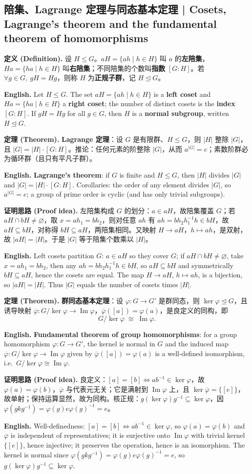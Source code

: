 \documentclass[UTF8,11pt,a4paper]{ctexart}
\newcommand{\EN}[1]{\par\noindent \textbf{English.} #1\par}
\newcommand{\DEF}[2]{\par\noindent\textbf{定义 (Definition).} #1\par\EN{#2}}
\newcommand{\THM}[2]{\par\noindent\textbf{定理 (Theorem).} #1\par\EN{#2}}
\newcommand{\PRF}[2]{\par\noindent\textbf{证明思路 (Proof idea).} #1\par\EN{#2}}
\begin{document}
\subsection{陪集、Lagrange 定理与同态基本定理 | Cosets, Lagrange's theorem and the fundamental theorem of homomorphisms}
\DEF{设 $H\le G$。$aH=\{ah\mid h\in H\}$ 叫 $a$ 的\textbf{左陪集}，$Ha=\{ha\mid h\in H\}$ 叫\textbf{右陪集}；不同陪集的个数叫\textbf{指数} $[G:H]$。若 $\forall g\in G,\ gH=Hg$，则称 $H$ 为\textbf{正规子群}，记 $H\trianglelefteq G$。}{Let $H\le G$. The set $aH=\{ah\mid h\in H\}$ is a \textbf{left coset} and $Ha=\{ha\mid h\in H\}$ a \textbf{right coset}; the number of distinct cosets is the \textbf{index} $[G:H]$. If $gH=Hg$ for all $g\in G$, then $H$ is a \textbf{normal subgroup}, written $H\trianglelefteq G$.}
\THM{\textbf{Lagrange 定理}：设 $G$ 是有限群、$H\le G$，则 $|H|$ 整除 $|G|$，且 $|G|=|H|\cdot[G:H]$。推论：任何元素的阶整除 $|G|$，从而 $a^{|G|}=e$；素数阶群必为循环群（且只有平凡子群）。}{\textbf{Lagrange's theorem}: if $G$ is finite and $H\le G$, then $|H|$ divides $|G|$ and $|G|=|H|\cdot[G:H]$. Corollaries: the order of any element divides $|G|$, so $a^{|G|}=e$; a group of prime order is cyclic (and has only trivial subgroups).}
\PRF{左陪集构成 $G$ 的划分：$a\in aH$，故陪集覆盖 $G$；若 $aH\cap bH\ne\varnothing$，取 $x=ah_1=bh_2$，则对任意 $ah$ 有 $ah=bh_2h_1^{-1}h\in bH$，故 $aH\subseteq bH$，对称得 $bH\subseteq aH$，两陪集相同。又映射 $H\to aH$，$h\mapsto ah$，是双射，故 $|aH|=|H|$。于是 $|G|$ 等于陪集个数乘以 $|H|$。}{Left cosets partition $G$: $a\in aH$ so they cover $G$; if $aH\cap bH\ne\varnothing$, take $x=ah_1=bh_2$, then any $ah=bh_2h_1^{-1}h\in bH$, so $aH\subseteq bH$ and symmetrically $bH\subseteq aH$, hence the cosets are equal. The map $H\to aH$, $h\mapsto ah$, is a bijection, so $|aH|=|H|$. Thus $|G|$ equals the number of cosets times $|H|$.}
\THM{\textbf{群同态基本定理}：设 $\varphi:G\to G'$ 是群同态，则 $\ker\varphi\trianglelefteq G$，且诱导映射 $\overline\varphi:G/\ker\varphi\to\operatorname{Im}\varphi$，$\overline\varphi([a])=\varphi(a)$，是良定义的同构，即
\[
G/\ker\varphi\;\cong\;\operatorname{Im}\varphi .
\]
}{\textbf{Fundamental theorem of group homomorphisms}: for a group homomorphism $\varphi:G\to G'$, the kernel is normal in $G$ and the induced map $\overline\varphi:G/\ker\varphi\to\operatorname{Im}\varphi$ given by $\overline\varphi([a])=\varphi(a)$ is a well-defined isomorphism, i.e.\ $G/\ker\varphi\cong\operatorname{Im}\varphi$.}
\PRF{良定义：$[a]=[b]\Leftrightarrow ab^{-1}\in\ker\varphi$，故 $\varphi(a)=\varphi(b)$，$\overline\varphi$ 与代表元无关；它是满射到 $\operatorname{Im}\varphi$ 上，且 $\ker\overline\varphi=\{[e]\}$，故单射；保持运算显然，故为同构。核正规：$g(\ker\varphi)g^{-1}\subseteq\ker\varphi$，因 $\varphi(gkg^{-1})=\varphi(g)e\varphi(g)^{-1}=e$。}{Well-definedness: $[a]=[b]\Leftrightarrow ab^{-1}\in\ker\varphi$, so $\varphi(a)=\varphi(b)$ and $\overline\varphi$ is independent of representatives; it is surjective onto $\operatorname{Im}\varphi$ with trivial kernel $\{[e]\}$, hence injective; it preserves the operation, hence is an isomorphism. The kernel is normal since $\varphi(gkg^{-1})=\varphi(g)e\varphi(g)^{-1}=e$, so $g(\ker\varphi)g^{-1}\subseteq\ker\varphi$.}
\end{document}

